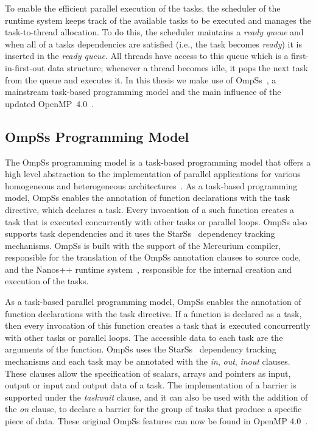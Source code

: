 {To enable the efficient parallel execution of the tasks, the scheduler of the runtime system keeps track of the available tasks to be executed and manages the task-to-thread allocation.
To do this, the scheduler maintains a \textit{ready queue} and when all of a tasks dependencies are satisfied (i.e., the task becomes \textit{ready}) it is inserted in the \textit{ready queue}. 
All threads have access to this queue which is a first-in-first-out data structure; whenever a thread becomes idle, it pops the next task from the queue and executes it. 
In this thesis we make use of OmpSs~\cite{OmpSs}, a mainstream task-based programming model and the main influence of the updated OpenMP~4.0~\cite{OpenMP}.

\subsection{OmpSs Programming Model}
\label{sec.background.taskbased.ompss}
The OmpSs programming model is a task-based programming model that offers a high level abstraction to the implementation of parallel applications for various homogeneous and heterogeneous architectures~\cite{OmpSs_PPL11,OmpSs}. 
As a task-based programming model, OmpSs enables the annotation of function declarations with the task directive, which declares a task. 
Every invocation of a such function creates a task that is executed concurrently with other tasks or parallel loops. 
OmpSs also supports task dependencies and it uses the StarSs~\cite{StarSs} dependency tracking mechanisms. 
OmpSs is built with the support of the Mercurium compiler, responsible for the translation of the OmpSs annotation clauses to source code, and the Nanos++ runtime system~\cite{nanos}, responsible for the internal creation and execution of the tasks.

As a task-based parallel programming model, OmpSs enables the annotation of function declarations with the task directive. 
If a function is declared as a task, then every invocation of this function creates a task that is executed concurrently with other tasks or parallel loops. 
The accessible data to each task are the arguments of the function. 
OmpSs uses the StarSs~\cite{StarSs} dependency tracking mechanisms and each task may be annotated with the \textit{in}, \textit{out}, \textit{inout} clauses. 
These clauses allow the specification of scalars, arrays and pointers as input, output or input and output data of a task. 
The implementation of a barrier is supported under the \textit{taskwait} clause, and it can also be used with the addition of the \textit{on} clause, to declare a barrier for the group of tasks that produce a specific piece of data. 
These original OmpSs features can now be found in OpenMP 4.0~\cite{OpenMP}.

}
